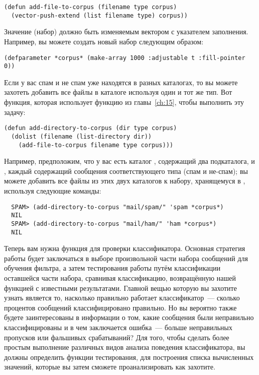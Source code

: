 \begin{lstlisting}
(defun add-file-to-corpus (filename type corpus)
  (vector-push-extend (list filename type) corpus))
\end{lstlisting}

Значение  (набор) должно быть изменяемым вектором с указателем заполнения.
Например, вы можете создать новый набор следующим образом:

\begin{lstlisting}
(defparameter *corpus* (make-array 1000 :adjustable t :fill-pointer 0))
\end{lstlisting}

Если у вас спам и не спам уже находятся в разных каталогах, то вы можете захотеть добавить
все файлы в каталоге используя один и тот же тип.  Вот функция, которая использует функцию
 из главы~\ref{ch:15}, чтобы выполнить эту задачу:

\begin{lstlisting}
(defun add-directory-to-corpus (dir type corpus)
  (dolist (filename (list-directory dir))
    (add-file-to-corpus filename type corpus)))
\end{lstlisting}

Например, предположим, что у вас есть каталог , содержащий два подкаталога,
 и , каждый содержащий сообщения соответствующего типа (спам и
не-спам); вы можете добавить все файлы из этих двух каталогов к набору, хранящемуся в
, используя следующие команды:

\begin{verbatim}
  SPAM> (add-directory-to-corpus "mail/spam/" 'spam *corpus*)
  NIL
  SPAM> (add-directory-to-corpus "mail/ham/" 'ham *corpus*)
  NIL
\end{verbatim}

Теперь вам нужна функция для проверки классификатора.  Основная стратегия работы будет
заключаться в выборе произвольной части набора сообщений для обучения фильтра, а затем
тестирования работы путём классификации оставшейся части набора, сравнивая классификацию,
возвращённую нашей функцией с известными результатами.  Главной вещью которую вы захотите
узнать является то, насколько правильно работает классификатор~--- сколько процентов
сообщений классифицировано правильно.  Но вы вероятно также будете заинтересованы в
информации о том, какие сообщения были неправильно классифицированы и в чем заключается
ошибка~--- больше неправильных пропусков или фальшивых срабатываний?  Для того, чтобы
сделать более простым выполнение различных видов анализа поведения классификатора, вы
должны определить функции тестирования, для построения списка вычисленных значений,
которые вы затем сможете проанализировать как захотите.

